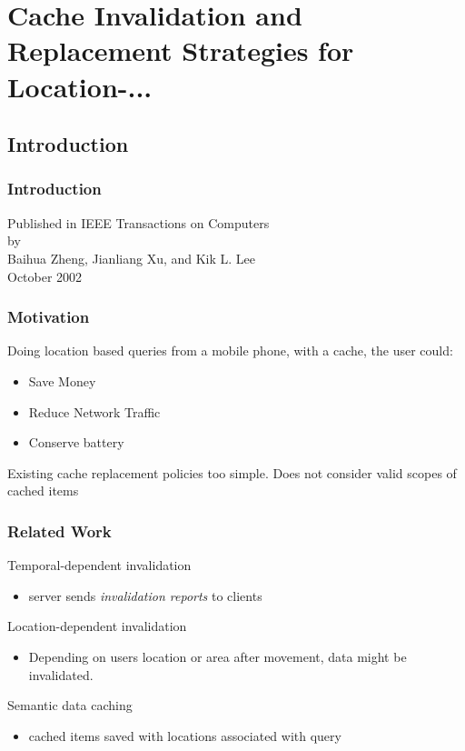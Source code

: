 \section{Cache Invalidation and Replacement Strategies for Location-...}

\subsection{Introduction}

\begin{frame}
\frametitle{Introduction}

	\begin{center}
	\Large
	Published in IEEE Transactions on Computers\\\vspace{1em}
	by\\\vspace{1em}
	Baihua Zheng, Jianliang Xu, and Kik L. Lee\\\vspace{1em}
	October 2002
	\end{center}

\end{frame}


\begin{frame}
\frametitle{Motivation}
\large
Doing location based queries from a mobile phone, with a cache, the user could:
\begin{itemize}
\item Save Money
\item Reduce Network Traffic
\item Conserve battery
\end{itemize}

\vspace{2em}
Existing cache replacement policies too simple. Does not consider valid scopes of cached items
\vspace{0.5em}

\end{frame}


\begin{frame}
\frametitle{Related Work}

Temporal-dependent invalidation
\begin{itemize}
\item server sends \textit{invalidation reports} to clients
\end{itemize}
\vspace{1em}
Location-dependent invalidation
\begin{itemize}
\item Depending on users location or area after movement, data might be invalidated.
\end{itemize}
\vspace{1em}
Semantic data caching
\begin{itemize}
\item cached items saved with locations associated with query
\end{itemize}

\end{frame}

